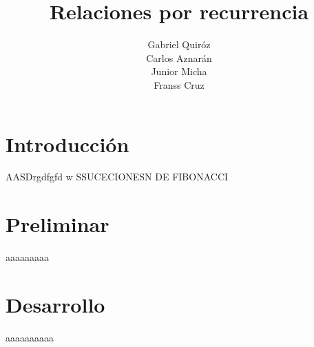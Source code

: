 \documentclass{report}
\title{Relaciones por recurrencia}
\author{Gabriel Quiróz\\Carlos Aznarán\\Junior Micha\\Franss Cruz\\}
\date{}
\begin{document}
\maketitle
\tableofcontents

\chapter*{Introducción}
AASDrgdfgfd w  SSUCECIONESN DE FIBONACCI


\chapter{Preliminar}
aaaaaaaaa
\chapter{Desarrollo}
aaaaaaaaaa

\chapter{}
\end{document}
